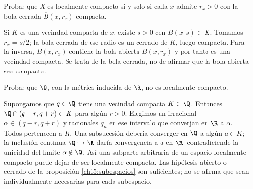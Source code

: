 \begin{ejercicio}\label{ej:lectura-15-3}
Probar que $X$ es localmente compacto si y solo si cada $x$ admite $r_x>0$ con la bola cerrada $\overline B(x,r_x)$ compacta.
\end{ejercicio}
\begin{solucion}
Si $K$ es una vecindad compacta de $x$, existe $s>0$ con $B(x,s)\subset K$. Tomamos $r_x=s/2$; la bola cerrada de ese radio es un cerrado de $K$, luego compacta. Para la inversa, $\overline B(x,r_x)$ contiene la bola abierta $B(x,r_x)$ y por tanto es una vecindad compacta. Se trata de la bola cerrada, no de afirmar que la bola abierta sea compacta.
\end{solucion}

\begin{ejercicio}\label{ej:lectura-15-4}
Probar que $\Q$, con la métrica inducida de $\R$, no es localmente compacto.
\end{ejercicio}
\begin{solucion}
Supongamos que $q\in\Q$ tiene una vecindad compacta $K\subset\Q$. Entonces $\Q\cap(q-r,q+r)\subset K$ para algún $r>0$. Elegimos un irracional $\alpha\in(q-r,q+r)$ y racionales $q_n$ en ese intervalo que converjan en $\R$ a $\alpha$. Todos pertenecen a $K$. Una subsucesión debería converger en $\Q$ a algún $a\in K$; la inclusión continua $\Q\hookrightarrow\R$ daría convergencia a $a$ en $\R$, contradiciendo la unicidad del límite $\alpha\notin\Q$. Así una subparte arbitraria de un espacio localmente compacto puede dejar de ser localmente compacta. Las hipótesis abierto o cerrado de la proposición \ref{ch15:subespacios} son suficientes; no se afirma que sean individualmente necesarias para cada subespacio.
\end{solucion}

